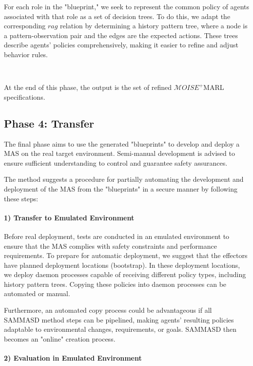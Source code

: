 \documentclass[sigconf,anonymous]{aamas}
\begin{document}
For each role in the "blueprint," we seek to represent the common policy of agents associated with that role as a set of decision trees. To do this, we adapt the corresponding $rag$ relation by determining a history pattern tree, where a node is a pattern-observation pair and the edges are the expected actions. These trees describe agents' policies comprehensively, making it easier to refine and adjust behavior rules.

\

At the end of this phase, the output is the set of refined $\mathcal{M}OISE^+$MARL specifications.

\subsection{Phase 4: Transfer}

The final phase aims to use the generated "blueprints" to develop and deploy a MAS on the real target environment. Semi-manual development is advised to ensure sufficient understanding to control and guarantee safety assurances.

The method suggests a procedure for partially automating the development and deployment of the MAS from the "blueprints" in a secure manner by following these steps:

\paragraph{\textbf{1) Transfer to Emulated Environment}}

Before real deployment, tests are conducted in an emulated environment to ensure that the MAS complies with safety constraints and performance requirements. To prepare for automatic deployment, we suggest that the effectors have planned deployment locations (bootstrap). In these deployment locations, we deploy daemon processes capable of receiving different policy types, including history pattern trees. Copying these policies into daemon processes can be automated or manual.

Furthermore, an automated copy process could be advantageous if all SAMMASD method steps can be pipelined, making agents' resulting policies adaptable to environmental changes, requirements, or goals. SAMMASD then becomes an "online" creation process.

\paragraph{\textbf{2) Evaluation in Emulated Environment}}
\end{document}
